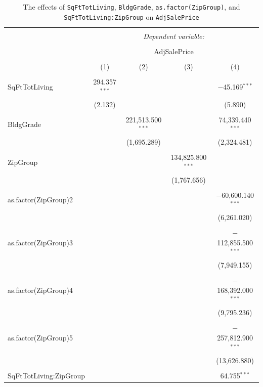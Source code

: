 \documentclass[12pt,a4paper]{article}
\begin{document}
\begin{table}[H] \centering 
	\caption{The effects of \texttt{SqFtTotLiving}, \texttt{BldgGrade}, \texttt{as.factor(ZipGroup)}, and \texttt{SqFtTotLiving:ZipGroup} on \texttt{AdjSalePrice}} 
	\label{}
	\begin{adjustbox}{width=1\textwidth}
	\begin{tabular}{@{\extracolsep{5pt}}lcccc} 
		\\[-1.8ex]\hline 
		\hline \\[-1.8ex] 
		& \multicolumn{4}{c}{\textit{Dependent variable:}} \\ 
		\cline{2-5} 
		\\[-1.8ex] & \multicolumn{4}{c}{AdjSalePrice} \\ 
		\\[-1.8ex] & (1) & (2) & (3) & (4)\\ 
		\hline \\[-1.8ex] 
		SqFtTotLiving & 294.357$^{***}$ &  &  & $-$45.169$^{***}$ \\ 
		& (2.132) &  &  & (5.890) \\ 
		& & & & \\ 
		BldgGrade &  & 221,513.500$^{***}$ &  & 74,339.440$^{***}$ \\ 
		&  & (1,695.289) &  & (2,324.481) \\ 
		& & & & \\ 
		ZipGroup &  &  & 134,825.800$^{***}$ &  \\ 
		&  &  & (1,767.656) &  \\ 
		& & & & \\ 
		as.factor(ZipGroup)2 &  &  &  & $-$60,600.140$^{***}$ \\ 
		&  &  &  & (6,261.020) \\ 
		& & & & \\ 
		as.factor(ZipGroup)3 &  &  &  & $-$112,855.500$^{***}$ \\ 
		&  &  &  & (7,949.155) \\ 
		& & & & \\ 
		as.factor(ZipGroup)4 &  &  &  & $-$168,392.000$^{***}$ \\ 
		&  &  &  & (9,795.236) \\ 
		& & & & \\ 
		as.factor(ZipGroup)5 &  &  &  & $-$257,812.900$^{***}$ \\ 
		&  &  &  & (13,626.880) \\ 
		& & & & \\ 
		SqFtTotLiving:ZipGroup &  &  &  & 64.755$^{***}$ \\ 

\end{tabular}
\end{adjustbox}
\end{table}
\end{document}
